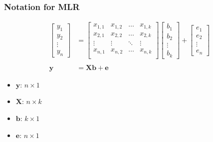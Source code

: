 \begin{frame}\frametitle{Notation for MLR}

	$$
	\begin{array}{rl}
		\begin{bmatrix}
			y_1\\
			y_2\\
			\vdots \\
			y_n
		\end{bmatrix}
		&=
		\begin{bmatrix}
			x_{1,1} & x_{1,2} & \ldots & x_{1,k}\\
			x_{2,1} & x_{2,2} & \ldots & x_{2,k}\\
			\vdots & \vdots & \ddots & \vdots\\
			x_{n,1} & x_{n,2} & \ldots & x_{n,k}\\
		\end{bmatrix}
		\begin{bmatrix}
			b_1 \\
			b_2 \\
			\vdots \\
			b_k
		\end{bmatrix}
		+
		\begin{bmatrix}
			e_1\\
			e_2\\
			\vdots \\
			e_n
		\end{bmatrix}
		\\
		& \\
		\mathbf{y} &= \mathbf{X} \mathbf{b} + \mathbf{e}
	\end{array}
	$$
	\begin{itemize}
		\item	$\mathbf{y}$: $n \times 1$
		\item	$\mathbf{X}$: $n \times k$
		\item	$\mathbf{b}$: $k \times 1$
		\item	$\mathbf{e}$: $n \times 1$
	\end{itemize}
\end{frame}

